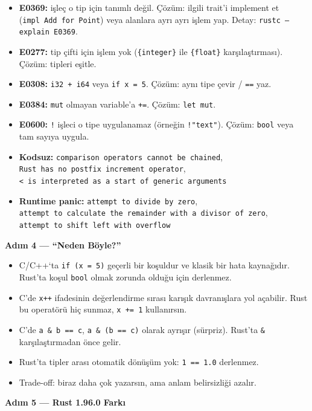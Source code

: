 \documentclass[12pt,a4paper]{article}
\begin{document}
\begin{itemize}
\tightlist
\item
  \textbf{E0369:} işleç o tip için tanımlı değil. Çözüm: ilgili trait'i implement et (\texttt{impl\ Add\ for\ Point}) veya alanlara ayrı ayrı işlem yap. Detay: \texttt{rustc\ --explain\ E0369}.
\item
  \textbf{E0277:} tip çifti için işlem yok (\texttt{\{integer\}} ile \texttt{\{float\}} karşılaştırması). Çözüm: tipleri eşitle.
\item
  \textbf{E0308:} \texttt{i32\ +\ i64} veya \texttt{if\ x\ =\ 5}. Çözüm: aynı tipe çevir / \texttt{==} yaz.
\item
  \textbf{E0384:} \texttt{mut} olmayan variable'a \texttt{+=}. Çözüm: \texttt{let\ mut}.
\item
  \textbf{E0600:} \texttt{!} işleci o tipe uygulanamaz (örneğin \texttt{!"text"}). Çözüm: \texttt{bool} veya tam sayıya uygula.
\item
  \textbf{Kodsuz:} \texttt{comparison\ operators\ cannot\ be\ chained}, \texttt{Rust\ has\ no\ postfix\ increment\ operator}, \texttt{\textless{}\ is\ interpreted\ as\ a\ start\ of\ generic\ arguments}
\item
  \textbf{Runtime panic:} \texttt{attempt\ to\ divide\ by\ zero}, \texttt{attempt\ to\ calculate\ the\ remainder\ with\ a\ divisor\ of\ zero}, \texttt{attempt\ to\ shift\ left\ with\ overflow}
\end{itemize}

\textbf{Adım 4 --- ``Neden Böyle?''}

\begin{itemize}
\tightlist
\item
  C/C++`ta \texttt{if\ (x\ =\ 5)} geçerli bir koşuldur ve klasik bir hata kaynağıdır. Rust'ta koşul \texttt{bool} olmak zorunda olduğu için derlenmez.
\item
  C'de \texttt{x++} ifadesinin değerlendirme sırası karışık davranışlara yol açabilir. Rust bu operatörü hiç sunmaz, \texttt{x\ +=\ 1} kullanırsın.
\item
  C'de \texttt{a\ \&\ b\ ==\ c}, \texttt{a\ \&\ (b\ ==\ c)} olarak ayrışır (sürpriz). Rust'ta \texttt{\&} karşılaştırmadan önce gelir.
\item
  Rust'ta tipler arası otomatik dönüşüm yok: \texttt{1\ ==\ 1.0} derlenmez.
\item
  Trade-off: biraz daha çok yazarsın, ama anlam belirsizliği azalır.
\end{itemize}

\textbf{Adım 5 --- Rust 1.96.0 Farkı}
\end{document}
